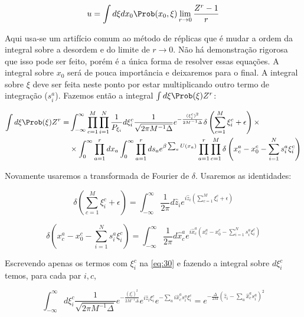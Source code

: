   \begin{equation}
    \label{eq:20}
    u = \int d\xi dx_0 \Prob(x_0, \xi) \lim_{r\to 0} \frac{Z^r - 1}{r}
  \end{equation}
  
  Aqui usa-se um artifício comum ao método de réplicas que é mudar a
  ordem da integral sobre a desordem e do limite de $r\to 0$. Não há
  demonstração rigorosa que isso pode ser feito, porém é a única forma
  de resolver essas equações. A integral sobre $x_0$ será de pouca
  importância e deixaremos para o final. A integral sobre $\xi$ deve
  ser feita neste ponto por estar multiplicando outro termo de
  integração ($s_i^a$). Fazemos então a integral $\int d\xi \Prob(\xi)
  Z^r$:

  \begin{align}
    \label{eq:30}
    \int d\xi \Prob(\xi)
  Z^r = & \int_{-\infty}^\infty \prod_{c=1}^M \prod_{i=1}^N \frac{1}{P_{\xi_i}} d\xi_i^c \frac{1}{\sqrt{2\pi M^{-1}\Delta}}e^{-\frac{(\xi_i^c)^2}{2 M^{-1}\Delta}}
    \delta\left(\sum_{c=1}^M \xi_i^c + \epsilon\right) \times \\ &
    \times \int_0^\infty \prod_{a=1}^r d x_a \int_0^\infty
    \prod_{a=1}^r d s_a e^{\beta \sum_a U(x_a)} \prod_{a=1}^r
    \prod_{c=1}^M \delta \left( x_c^a - x_0^c - \sum_{i=1}^N s_i^a
      \xi_i^c\right) \nonumber
  \end{align}

Novamente usaremos a transformada de Fourier de $\delta$. Usaremos as
identidades:

\begin{equation}
  \label{eq:31}
  \delta\left(\sum_{c=1}^M \xi_i^c + \epsilon\right) =
  \int_{-\infty}^\infty \frac{1}{2\pi} d\hat{z}_i e^{i \hat{z}_i \left(\sum_{c=1}^M \xi_i^c + \epsilon\right)}
\end{equation}

\begin{equation}
  \label{eq:32}
  \delta \left(x_c^a - x_0^c - \sum_{i=1}^N s_i^a \xi_i^c\right) = \int_{-\infty}^\infty \frac{1}{2\pi} d\hat{x}_c^a e^{i \hat{x}_c^a \left(x_c^a - x_0^c - \sum_{i=1}^N s_i^a \xi_i^c\right)}
\end{equation}

Escrevendo apenas os termos com $\xi_i^c$ na \eqref{eq:30} e fazendo a
integral sobre $d\xi_i^c$ temos, para cada par $i,c$,

\begin{equation}
  \label{eq:34}
  \int_{-\infty}^\infty d\xi_i^c \frac{1}{\sqrt{2\pi
      M^{-1}\Delta}}e^{-\frac{(\xi_i^c)^2}{2 M^{-1}\Delta}} e^{i
    \hat{z}_i \xi_i^c} e^{-\sum_a i \hat{x}_c^a s_i^a \xi_i^c} =
  e^{-\frac{\Delta}{2M} \left(\hat{z}_i - \sum_a \hat{x}_c^a s_i^a\right)^2}
\end{equation}

